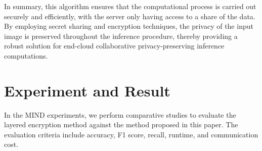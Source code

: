 \documentclass[conference]{IEEEtran}
\newcommand{\DEnc}{\texttt{DEnc}}
\newcommand{\PEnc}{\texttt{PEnc}}
\begin{document}


In summary, this algorithm ensures that the computational process is carried out securely and efficiently, with the server only having access to a share of the data. By employing secret sharing and encryption techniques, the privacy of the input image is preserved throughout the inference procedure, thereby providing a robust solution for end-cloud collaborative privacy-preserving inference computations.



\section{Experiment and Result}
In the MIND experiments, we perform comparative studies to evaluate the layered encryption method against the method proposed in this paper. The evaluation criteria include accuracy, F1 score, recall, runtime, and communication cost.
\end{document}
